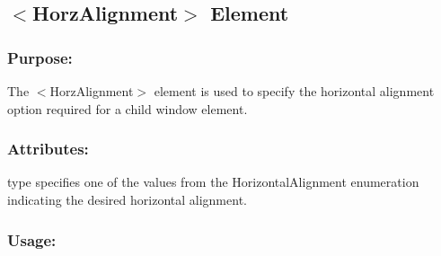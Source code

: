 \hypertarget{fal_element_ref_fal_elem_ref_sec_15}{}\subsection{$<$\+Horz\+Alignment$>$ Element}\label{fal_element_ref_fal_elem_ref_sec_15}
\hypertarget{fal_element_ref_fal_elem_ref_sec_15_1}{}\subsubsection{Purpose\+:}\label{fal_element_ref_fal_elem_ref_sec_15_1}
The {\ttfamily $<$Horz\+Alignment$>$} element is used to specify the horizontal alignment option required for a child window element.\hypertarget{fal_element_ref_fal_elem_ref_sec_15_2}{}\subsubsection{Attributes\+:}\label{fal_element_ref_fal_elem_ref_sec_15_2}
\begin{DoxyItemize}
\item {\ttfamily type} specifies one of the values from the Horizontal\+Alignment enumeration indicating the desired horizontal alignment.\end{DoxyItemize}
\hypertarget{fal_element_ref_fal_elem_ref_sec_15_3}{}\subsubsection{Usage\+:}\label{fal_element_ref_fal_elem_ref_sec_15_3}

